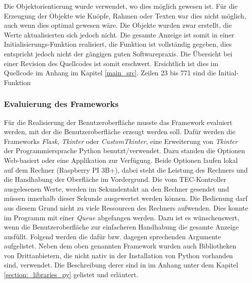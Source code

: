 Die Objektorientierung wurde verwendet, wo dies möglich gewesen ist. Für die Erzeugung der Objekte wie Knöpfe, Rahmen oder Texten war dies nicht möglich, auch wenn dies optimal gewesen wäre. Die Objekte wurden zwar erstellt, die Werte aktualisierten sich jedoch nicht. Die gesamte Anzeige ist somit in einer Initialisierungs-Funktion realisiert, die Funktion ist vollständig gegeben, dies entspricht jedoch nicht der gängigen guten Softwarepraxis. Die Übersicht bei einer Revision des Quellcodes ist somit erschwert. Ersichtlich ist dies im Quellcode im Anhang im Kapitel \ref{main_src}. Zeilen 23 bis 771 sind die Initial-Funktion

\subsubsection{Evaluierung des Frameworks}
Für die Realisierung der Benutzeroberfläche musste das Framework evaluiert werden, mit der die Benutzeroberfläche erzeugt werden soll. Dafür werden die Frameworks \textit{Flask}, \textit{Tkinter} oder \textit{CustomTkinter}, eine Erweiterung von \textit{Tkinter} der Programmiersprache Python benutzt/verwendet. Dazu standen die Optionen Web-basiert oder eine Applikation zur Verfügung. Beide Optionen laufen lokal auf dem Rechner (Raspberry PI 3B+), dabei steht die Leistung des Rechners und die Handhabung der Oberfläche im Vordergrund. Die vom TEC-Kontroller ausgelesenen Werte, werden im Sekundentakt an den Rechner gesendet und müssen innerhalb dieser Sekunde ausgewertet werden können. Die Bedienung darf aus diesem Grund nicht zu viele Ressourcen des Rechners aufwenden. Dies konnte im Programm mit einer \textit{Queue} abgefangen werden. Dazu ist es wünschenswert, wenn die Benutzeroberfläche zur einfacheren Handhabung die gesamte Anzeige ausfüllt. Folgend werden die dafür bzw. dagegen sprechenden Argumente aufgelistet.
Neben dem oben genannten Framework wurden auch Bibliotheken von Drittanbietern, die nicht nativ in der Installation von Python vorhanden sind, verwendet. Die Beschreibung derer sind in im Anhang unter dem Kapitel \ref{section:_libraries_py} gelistet und erläutert.

